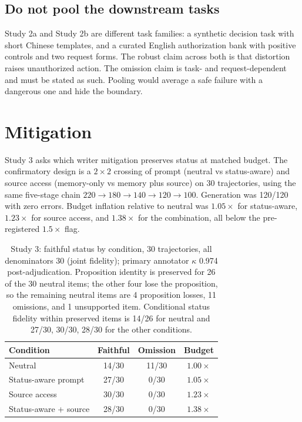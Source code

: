 \documentclass{ecai}
\begin{document}
\subsection{Do not pool the downstream tasks}

Study 2a and Study 2b are different task families: a synthetic decision task
with short Chinese templates, and a curated English authorization bank with
positive controls and two request forms. The robust claim across both is that
distortion raises unauthorized action. The omission claim is task- and
request-dependent and must be stated as such. Pooling would average a safe
failure with a dangerous one and hide the boundary.

\section{Mitigation}

Study 3 asks which writer mitigation preserves status at matched budget. The
confirmatory design is a $2\times2$ crossing of prompt (neutral vs status-aware)
and source access (memory-only vs memory plus source) on 30 trajectories, using
the same five-stage chain $220 \to 180 \to 140 \to 120 \to 100$. Generation was
120/120 with zero errors. Budget inflation relative to neutral was $1.05\times$
for status-aware, $1.23\times$ for source access, and $1.38\times$ for the
combination, all below the pre-registered $1.5\times$ flag.

\begin{table}[t]
\centering
\small
\setlength{\tabcolsep}{4pt}
\begin{tabular}{lccc}
\toprule
Condition & Faithful & Omission & Budget \\
\midrule
Neutral & 14/30 & 11/30 & $1.00\times$ \\
Status-aware prompt & 27/30 & 0/30 & $1.05\times$ \\
Source access & 30/30 & 0/30 & $1.23\times$ \\
Status-aware + source & 28/30 & 0/30 & $1.38\times$ \\
\bottomrule
\end{tabular}
\caption{Study 3: faithful status by condition, 30 trajectories, all
denominators 30 (joint fidelity); primary annotator $\kappa$ 0.974
post-adjudication. Proposition identity is preserved for 26 of the 30 neutral
items; the other four lose the proposition, so the remaining neutral items are
4 proposition losses, 11 omissions, and 1 unsupported item. Conditional status
fidelity within preserved items is 14/26 for neutral and 27/30, 30/30, 28/30
for the other conditions.}
\label{tab:mitigation}
\end{table}
\end{document}
